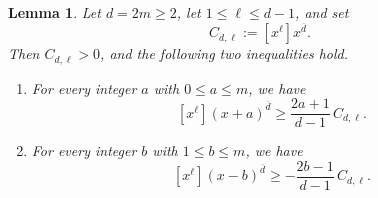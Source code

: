 \documentclass[reqno, 12pt]{article}
\numberwithin{equation}{section}
\newtheorem{lemma}[theorem]{Lemma}
\theoremstyle{definition}
\begin{document}
\begin{lemma}\label{lem:shifted-rising-comparison}
Let $d=2m\geq2$, let $1\leq\ell\leq d-1$, and set
\[C_{d,\ell}:=[x^\ell]x^{\overline d}.
\]
Then $C_{d,\ell}>0$, and the following two inequalities hold.
\begin{enumerate}
\item[(a)] For every integer $a$ with $0\leq a\leq m$, we have 
\begin{equation}\label{eq:positive-rising-shift}
[x^\ell](x+a)^{\overline d}\geq\frac{2a+1}{d-1}\,C_{d,\ell}.
\end{equation}
\item[(b)] For every integer $b$ with $1\leq b\leq m$, we have 
\begin{equation}\label{eq:negative-rising-shift}
[x^\ell](x-b)^{\overline d}\geq-\frac{2b-1}{d-1}\,C_{d,\ell}.
\end{equation}
\end{enumerate}
\end{lemma}
\end{document}
